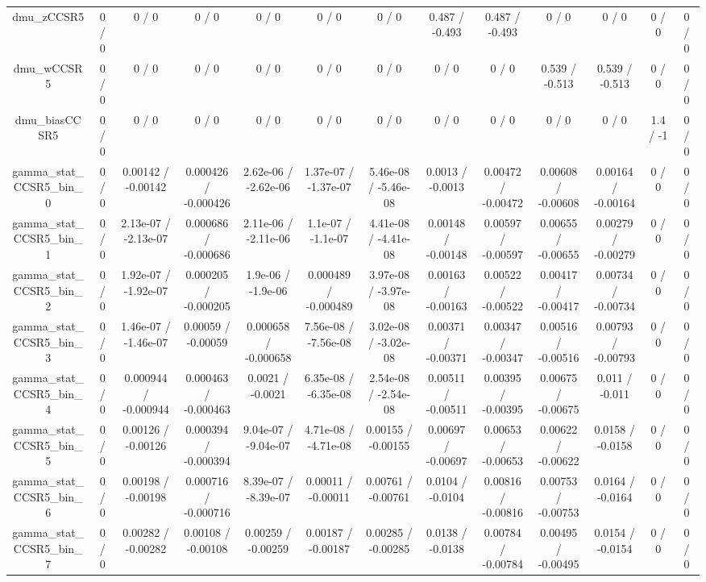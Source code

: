 \documentclass[10pt]{article}
\begin{document}
\begin{table}[htbp]
\begin{center}
\begin{tabular}{|c|c|c|c|c|c|c|c|c|c|c|c|c|}
  dmu_zCCSR5 & 0 / 0 & 0 / 0 & 0 / 0 & 0 / 0 & 0 / 0 & 0 / 0 & 0.487 / -0.493 & 0.487 / -0.493 & 0 / 0 & 0 / 0 & 0 / 0 & 0 / 0 \\ 
  dmu_wCCSR5 & 0 / 0 & 0 / 0 & 0 / 0 & 0 / 0 & 0 / 0 & 0 / 0 & 0 / 0 & 0 / 0 & 0.539 / -0.513 & 0.539 / -0.513 & 0 / 0 & 0 / 0 \\ 
  dmu_biasCCSR5 & 0 / 0 & 0 / 0 & 0 / 0 & 0 / 0 & 0 / 0 & 0 / 0 & 0 / 0 & 0 / 0 & 0 / 0 & 0 / 0 & 1.4 / -1 & 0 / 0 \\ 
  gamma_stat_CCSR5_bin_0 & 0 / 0 & 0.00142 / -0.00142 & 0.000426 / -0.000426 & 2.62e-06 / -2.62e-06 & 1.37e-07 / -1.37e-07 & 5.46e-08 / -5.46e-08 & 0.0013 / -0.0013 & 0.00472 / -0.00472 & 0.00608 / -0.00608 & 0.00164 / -0.00164 & 0 / 0 & 0 / 0 \\ 
  gamma_stat_CCSR5_bin_1 & 0 / 0 & 2.13e-07 / -2.13e-07 & 0.000686 / -0.000686 & 2.11e-06 / -2.11e-06 & 1.1e-07 / -1.1e-07 & 4.41e-08 / -4.41e-08 & 0.00148 / -0.00148 & 0.00597 / -0.00597 & 0.00655 / -0.00655 & 0.00279 / -0.00279 & 0 / 0 & 0 / 0 \\ 
  gamma_stat_CCSR5_bin_2 & 0 / 0 & 1.92e-07 / -1.92e-07 & 0.000205 / -0.000205 & 1.9e-06 / -1.9e-06 & 0.000489 / -0.000489 & 3.97e-08 / -3.97e-08 & 0.00163 / -0.00163 & 0.00522 / -0.00522 & 0.00417 / -0.00417 & 0.00734 / -0.00734 & 0 / 0 & 0 / 0 \\ 
  gamma_stat_CCSR5_bin_3 & 0 / 0 & 1.46e-07 / -1.46e-07 & 0.00059 / -0.00059 & 0.000658 / -0.000658 & 7.56e-08 / -7.56e-08 & 3.02e-08 / -3.02e-08 & 0.00371 / -0.00371 & 0.00347 / -0.00347 & 0.00516 / -0.00516 & 0.00793 / -0.00793 & 0 / 0 & 0 / 0 \\ 
  gamma_stat_CCSR5_bin_4 & 0 / 0 & 0.000944 / -0.000944 & 0.000463 / -0.000463 & 0.0021 / -0.0021 & 6.35e-08 / -6.35e-08 & 2.54e-08 / -2.54e-08 & 0.00511 / -0.00511 & 0.00395 / -0.00395 & 0.00675 / -0.00675 & 0.011 / -0.011 & 0 / 0 & 0 / 0 \\ 
  gamma_stat_CCSR5_bin_5 & 0 / 0 & 0.00126 / -0.00126 & 0.000394 / -0.000394 & 9.04e-07 / -9.04e-07 & 4.71e-08 / -4.71e-08 & 0.00155 / -0.00155 & 0.00697 / -0.00697 & 0.00653 / -0.00653 & 0.00622 / -0.00622 & 0.0158 / -0.0158 & 0 / 0 & 0 / 0 \\ 
  gamma_stat_CCSR5_bin_6 & 0 / 0 & 0.00198 / -0.00198 & 0.000716 / -0.000716 & 8.39e-07 / -8.39e-07 & 0.00011 / -0.00011 & 0.00761 / -0.00761 & 0.0104 / -0.0104 & 0.00816 / -0.00816 & 0.00753 / -0.00753 & 0.0164 / -0.0164 & 0 / 0 & 0 / 0 \\ 
  gamma_stat_CCSR5_bin_7 & 0 / 0 & 0.00282 / -0.00282 & 0.00108 / -0.00108 & 0.00259 / -0.00259 & 0.00187 / -0.00187 & 0.00285 / -0.00285 & 0.0138 / -0.0138 & 0.00784 / -0.00784 & 0.00495 / -0.00495 & 0.0154 / -0.0154 & 0 / 0 & 0 / 0 \\ 

\end{tabular}
\end{center}
\end{table}
\end{document}
